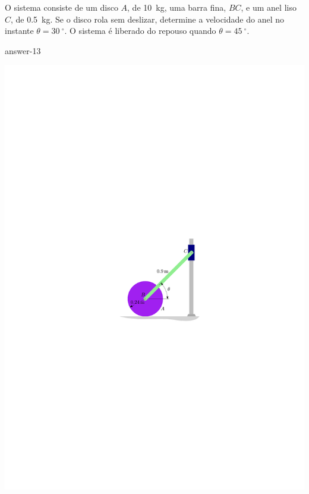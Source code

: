 \item O sistema consiste de um disco $A$, de \SI{10}{\kilogram}, uma barra fina, $BC$, e um anel liso $C$, de \SI{.5}{\kilogram}. Se o disco rola sem deslizar, determine a velocidade do anel no instante $\theta=\SI{30}{^{\circ}}$. O sistema é liberado do repouso quando $\theta=\SI{45}{^{\circ}}$.

{answer-13}

\vspace{-1.5cm}
\begin{flushright}
	\includegraphics[scale=1.2]{../../images/draw_6}
\end{flushright}